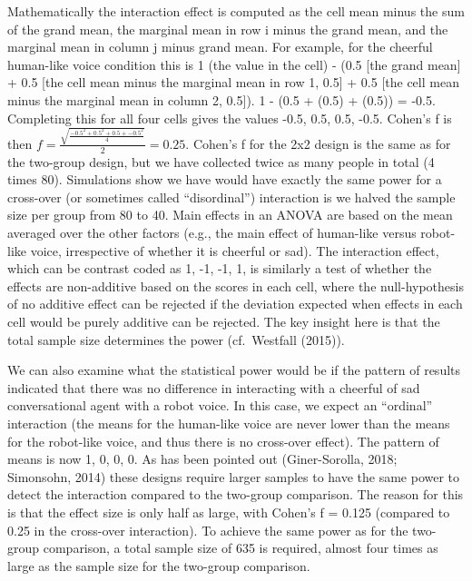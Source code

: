 \documentclass[,jou, draftfirst, a4paper,floatsintext]{apa6}
\begin{document}
Mathematically the interaction effect is computed as the cell mean minus the sum of the grand mean, the marginal mean in row i minus the grand mean, and the marginal mean in column j minus grand mean. For example, for the cheerful human-like voice condition this is 1 (the value in the cell) - (0.5 {[}the grand mean{]} + 0.5 {[}the cell mean minus the marginal mean in row 1, 0.5{]} + 0.5 {[}the cell mean minus the marginal mean in column 2, 0.5{]}). 1 - (0.5 + (0.5) + (0.5)) = -0.5.
Completing this for all four cells gives the values -0.5, 0.5, 0.5, -0.5.
Cohen's f is then \(f = \frac { \sqrt { \frac { -0.5^2 + 0.5^2 + 0.5 + -0.5^2 } { 4 } }}{ 2 } = 0.25\).
Cohen's f for the 2x2 design is the same as for the two-group design, but we have collected twice as many people in total (4 times 80).
Simulations show we have would have exactly the same power for a cross-over (or sometimes called \enquote{disordinal}) interaction is we halved the sample size per group from 80 to 40.
Main effects in an ANOVA are based on the mean averaged over the other factors (e.g., the main effect of human-like versus robot-like voice, irrespective of whether it is cheerful or sad).
The interaction effect, which can be contrast coded as 1, -1, -1, 1, is similarly a test of whether the effects are non-additive based on the scores in each cell, where the null-hypothesis of no additive effect can be rejected if the deviation expected when effects in each cell would be purely additive can be rejected.
The key insight here is that the total sample size determines the power (cf.~Westfall (2015)).

We can also examine what the statistical power would be if the pattern of results indicated that there was no difference in interacting with a cheerful of sad conversational agent with a robot voice.
In this case, we expect an \enquote{ordinal} interaction (the means for the human-like voice are never lower than the means for the robot-like voice, and thus there is no cross-over effect).
The pattern of means is now 1, 0, 0, 0.
As has been pointed out (Giner-Sorolla, 2018; Simonsohn, 2014) these designs require larger samples to have the same power to detect the interaction compared to the two-group comparison.
The reason for this is that the effect size is only half as large, with Cohen's f = 0.125 (compared to 0.25 in the cross-over interaction).
To achieve the same power as for the two-group comparison, a total sample size of 635 is required, almost four times as large as the sample size for the two-group comparison.
\end{document}
